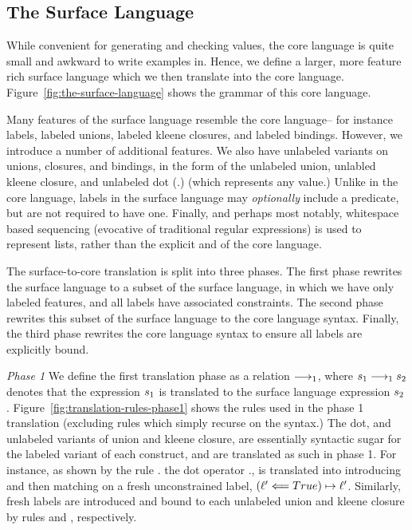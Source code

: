 \subsection{The Surface Language} \label{subsec:the-surface-language}


While convenient for generating and checking values,
the core language is quite small and awkward
to write examples in.
Hence, we define a larger, more feature rich surface language
which we then translate into the core language.
Figure~\ref{fig:the-surface-language}
shows the grammar of this core language.

Many features of the surface language resemble the core language--
for instance labels, labeled unions, labeled kleene closures, and labeled bindings.
However, we introduce a number of additional features.
We also have unlabeled variants on unions, closures, and bindings, in the form of the
unlabeled union, unlabled kleene closure, and unlabeled dot ($.$) (which represents any value.)
Unlike in the core language,
labels in the surface language may \textit{optionally} include a predicate,
but are not required to have one.
Finally,
and perhaps most notably,
whitespace based sequencing
(evocative of traditional regular expressions)
is used to represent lists,
rather than the explicit \cons and \concat of the core language.


The surface-to-core translation is split into three phases.
The first phase rewrites the surface language to a subset of the surface language,
in which we have only
labeled features,
and
all labels have associated constraints.
The second phase rewrites this subset of the surface language to the core language syntax.
Finally, the third phase rewrites the core language syntax
to ensure all labels are explicitly bound.


\textit{Phase 1}
We define the first translation phase as a relation $\longrightarrow_1$,
where $s_1 \longrightarrow_1 s_2$ denotes
that the expression $s_1$ is translated to the surface language expression $s_2$. 
Figure~\ref{fig:translation-rules-phase1}
shows the rules
used in the phase 1 translation
(excluding rules which simply recurse on the syntax.)
The dot, and unlabeled variants of union and kleene closure,
are essentially syntactic sugar for the labeled variant of each construct,
and are translated as such in phase 1.
For instance,
as shown by the rule
\DotNoPredTrans.
the dot operator $.$,
is translated into
introducing and then matching on a fresh unconstrained label, $(\ell' \Longleftarrow True) \mapsto \ell'$.
Similarly, fresh labels are introduced and bound to each unlabeled union and kleene closure
by rules \UnlabelledUnionTrans and \UnlabelledStarBaseTrans, respectively.

